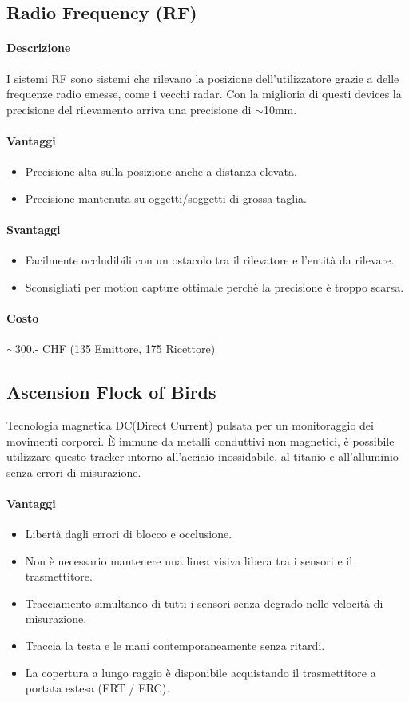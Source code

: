\documentclass[8pt]{extarticle}
\begin{document}
\begin{multicols}{3}
\subsection{Radio Frequency (RF)}
\paragraph{Descrizione}
I sistemi RF sono sistemi che rilevano la posizione dell'utilizzatore grazie a delle 
frequenze radio emesse, come i vecchi radar. Con la miglioria di questi devices la 
precisione del rilevamento arriva una precisione di $\sim$10mm.
\paragraph{Vantaggi}
\begin{itemize}
    \item Precisione alta sulla posizione anche a distanza elevata.
    \item Precisione mantenuta su oggetti/soggetti di grossa taglia.
\end{itemize}
\paragraph{Svantaggi}
\begin{itemize}
    \item Facilmente occludibili con un ostacolo tra il rilevatore e l'entità da
    rilevare.
    \item Sconsigliati per motion capture ottimale perchè la precisione è troppo scarsa.
\end{itemize}
\paragraph{Costo} $\sim$300.- CHF (135 Emittore, 175 Ricettore) 

\subsection{Ascension Flock of Birds}
Tecnologia magnetica DC(Direct Current) pulsata per un monitoraggio dei movimenti corporei. È immune da metalli conduttivi non magnetici, è
possibile utilizzare questo tracker intorno all'acciaio inossidabile, al titanio e all'alluminio senza errori di misurazione.
\paragraph{Vantaggi}
\begin{itemize}
    \item Libertà dagli errori di blocco e occlusione.
    \item Non è necessario mantenere una linea visiva libera tra i sensori e il trasmettitore.
    \item Tracciamento simultaneo di tutti i sensori senza degrado nelle velocità di misurazione.
    \item Traccia la testa e le mani contemporaneamente senza ritardi.
    \item La copertura a lungo raggio è disponibile acquistando il trasmettitore a portata estesa (ERT / ERC).
\end{itemize}

\end{multicols}
\end{document}
